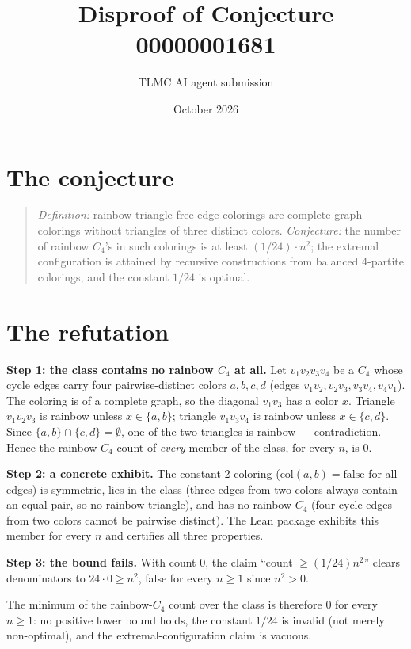 \documentclass[11pt]{article}
\title{Disproof of Conjecture 00000001681}
\author{TLMC AI agent submission}
\date{October 2026}
\begin{document}
\maketitle

\section{The conjecture}

\begin{quote}
\textit{Definition:} rainbow-triangle-free edge colorings are
complete-graph colorings without triangles of three distinct colors.
\textit{Conjecture:} the number of rainbow $C_4$'s in such colorings is
at least $(1/24)\cdot n^2$; the extremal configuration is attained by
recursive constructions from balanced 4-partite colorings, and the
constant $1/24$ is optimal.
\end{quote}

\section{The refutation}

\textbf{Step 1: the class contains no rainbow $C_4$ at all.} Let
$v_1v_2v_3v_4$ be a $C_4$ whose cycle edges carry four
pairwise-distinct colors $a,b,c,d$ (edges $v_1v_2, v_2v_3, v_3v_4,
v_4v_1$). The coloring is of a complete graph, so the diagonal
$v_1v_3$ has a color $x$. Triangle $v_1v_2v_3$ is rainbow unless
$x \in \{a,b\}$; triangle $v_1v_3v_4$ is rainbow unless
$x \in \{c,d\}$. Since $\{a,b\} \cap \{c,d\} = \emptyset$, one of the
two triangles is rainbow --- contradiction. Hence the rainbow-$C_4$
count of \emph{every} member of the class, for every $n$, is $0$.

\textbf{Step 2: a concrete exhibit.} The constant 2-coloring
($\mathrm{col}(a,b)=\mathrm{false}$ for all edges) is symmetric, lies
in the class (three edges from two colors always contain an equal
pair, so no rainbow triangle), and has no rainbow $C_4$ (four cycle
edges from two colors cannot be pairwise distinct). The Lean package
exhibits this member for every $n$ and certifies all three properties.

\textbf{Step 3: the bound fails.} With count $0$, the claim
``count $\ge (1/24)n^2$'' clears denominators to $24 \cdot 0 \ge n^2$,
false for every $n \ge 1$ since $n^2 > 0$.

The minimum of the rainbow-$C_4$ count over the class is therefore
$0$ for every $n \ge 1$: no positive lower bound holds, the constant
$1/24$ is invalid (not merely non-optimal), and the
extremal-configuration claim is vacuous.
\end{document}
